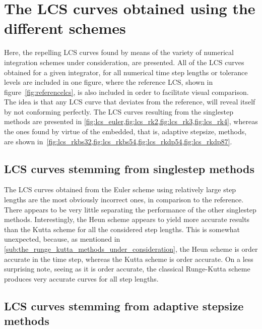 \section{The LCS curves obtained using the different schemes}
\label{sec:the_lcs_curves_obtained_using_the_different_schemes}

Here, the repelling LCS curves found by means of the variety of
numerical integration schemes under consideration, are presented. All of the
LCS curves obtained for a given integrator, for all numerical time step lengths
or tolerance levels are included in one figure, where the reference LCS, shown
in figure~\ref{fig:referencelcs}, is also included in order to facilitate
visual comparison. The idea is that any LCS curve that deviates from the
reference, will reveal itself by not conforming perfectly. The LCS curves
resulting from the singlestep methods are presented in
\cref{fig:lcs_euler,fig:lcs_rk2,fig:lcs_rk3,fig:lcs_rk4}, whereas the ones
found by virtue of the embedded, that is, adaptive stepsize, methods, are
shown in~\cref{fig:lcs_rkbs32,fig:lcs_rkbs54,fig:lcs_rkdp54,fig:lcs_rkdp87}.

\subsection{LCS curves stemming from singlestep methods}
\label{sub:lcs_curves_stemming_from_singlestep_methods}








The LCS curves obtained from the Euler scheme using relatively large step
lengths are the most obviously incorrect ones, in comparison to the reference.
There appears to be very little separating the performance of the other
singlestep methods. Interestingly, the Heun scheme appears to yield more
accurate results than the Kutta scheme for all the considered step lengths.
This is somewhat unexpected, because, as mentioned in
\cref{sub:the_runge_kutta_methods_under_consideration}, the Heun scheme is
 order accurate in the time step, whereas the Kutta scheme is 
order accurate. On a less surprising note, seeing as it is  order
accurate, the classical Runge-Kutta scheme produces very accurate curves for
all step lengths.

\subsection{LCS curves stemming from adaptive stepsize methods}
\label{sub:lcs_curves_stemming_from_adaptive_stepsize_methods}

